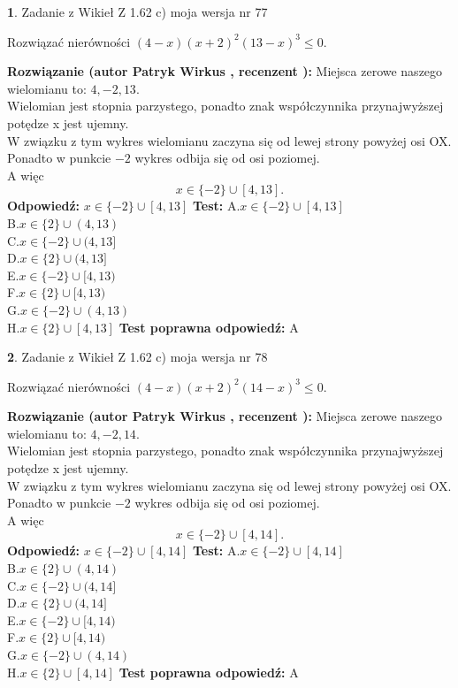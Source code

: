 \documentclass[12pt, a4paper]{article}
\theoremstyle{definition} %
\newtheorem{zad}{}
\newcommand{\zadStart}[1]{\begin{zad}#1\newline}
\newcommand{\zadStop}{\end{zad}}
\newcommand{\rozwStart}[2]{\noindent \textbf{Rozwiązanie (autor #1 , recenzent #2): }\newline}
\newcommand{\rozwStop}{\newline}
\newcommand{\odpStart}{\noindent \textbf{Odpowiedź:}\newline}
\newcommand{\odpStop}{\newline}
\newcommand{\testStart}{\noindent \textbf{Test:}\newline}
\newcommand{\testStop}{\newline}
\newcommand{\kluczStart}{\noindent \textbf{Test poprawna odpowiedź:}\newline}
\newcommand{\kluczStop}{\newline}
\begin{document}
\zadStart{Zadanie z Wikieł Z 1.62 c) moja wersja nr 77}

Rozwiązać nierówności $(4-x)(x+2)^{2}(13-x)^{3}\le0$.
\zadStop
\rozwStart{Patryk Wirkus}{}
Miejsca zerowe naszego wielomianu to: $4, -2, 13$.\\
Wielomian jest stopnia parzystego, ponadto znak współczynnika przy\linebreak najwyższej potędze x jest ujemny.\\ W związku z tym wykres wielomianu zaczyna się od lewej strony powyżej osi OX.\\
Ponadto w punkcie $-2$ wykres odbija się od osi poziomej.\\
A więc $$x \in \{-2\} \cup [4,13].$$
\rozwStop
\odpStart
$x \in \{-2\} \cup [4,13]$
\odpStop
\testStart
A.$x \in \{-2\} \cup [4,13]$\\
B.$x \in \{2\} \cup (4,13)$\\
C.$x \in \{-2\} \cup (4,13]$\\
D.$x \in \{2\} \cup (4,13]$\\
E.$x \in \{-2\} \cup [4,13)$\\
F.$x \in \{2\} \cup [4,13)$\\
G.$x \in \{-2\} \cup (4,13)$\\
H.$x \in \{2\} \cup [4,13]$
\testStop
\kluczStart
A
\kluczStop



\zadStart{Zadanie z Wikieł Z 1.62 c) moja wersja nr 78}

Rozwiązać nierówności $(4-x)(x+2)^{2}(14-x)^{3}\le0$.
\zadStop
\rozwStart{Patryk Wirkus}{}
Miejsca zerowe naszego wielomianu to: $4, -2, 14$.\\
Wielomian jest stopnia parzystego, ponadto znak współczynnika przy\linebreak najwyższej potędze x jest ujemny.\\ W związku z tym wykres wielomianu zaczyna się od lewej strony powyżej osi OX.\\
Ponadto w punkcie $-2$ wykres odbija się od osi poziomej.\\
A więc $$x \in \{-2\} \cup [4,14].$$
\rozwStop
\odpStart
$x \in \{-2\} \cup [4,14]$
\odpStop
\testStart
A.$x \in \{-2\} \cup [4,14]$\\
B.$x \in \{2\} \cup (4,14)$\\
C.$x \in \{-2\} \cup (4,14]$\\
D.$x \in \{2\} \cup (4,14]$\\
E.$x \in \{-2\} \cup [4,14)$\\
F.$x \in \{2\} \cup [4,14)$\\
G.$x \in \{-2\} \cup (4,14)$\\
H.$x \in \{2\} \cup [4,14]$
\testStop
\kluczStart
A
\kluczStop
\end{document}
